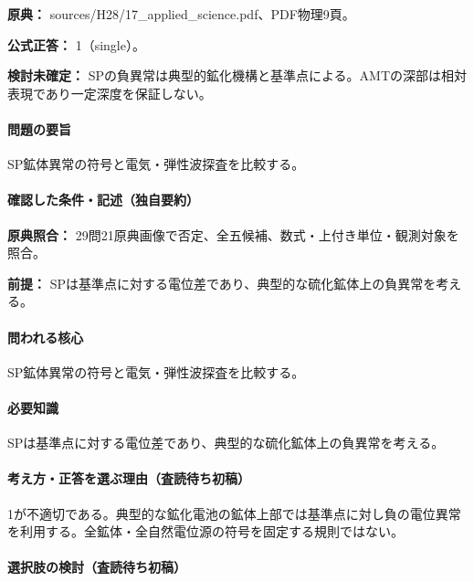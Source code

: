 \noindent\textbf{原典：} sources/H28/17\_applied\_science.pdf、PDF物理9頁。

\textbf{公式正答：} 1（single）。

\par\textbf{検討未確定：} SPの負異常は典型的鉱化機構と基準点による。AMTの深部は相対表現であり一定深度を保証しない。

\paragraph{問題の要旨} SP鉱体異常の符号と電気・弾性波探査を比較する。

\paragraph{確認した条件・記述（独自要約）}\mbox{}\par

\noindent\textbf{原典照合：} 29問21原典画像で否定、全五候補、数式・上付き単位・観測対象を照合。\par

\noindent\textbf{前提：} SPは基準点に対する電位差であり、典型的な硫化鉱体上の負異常を考える。\par

\paragraph{問われる核心} SP鉱体異常の符号と電気・弾性波探査を比較する。

\paragraph{必要知識} SPは基準点に対する電位差であり、典型的な硫化鉱体上の負異常を考える。

\paragraph{考え方・正答を選ぶ理由（査読待ち初稿）} 1が不適切である。典型的な鉱化電池の鉱体上部では基準点に対し負の電位異常を利用する。全鉱体・全自然電位源の符号を固定する規則ではない。

\paragraph{選択肢の検討（査読待ち初稿）}\mbox{}\par

